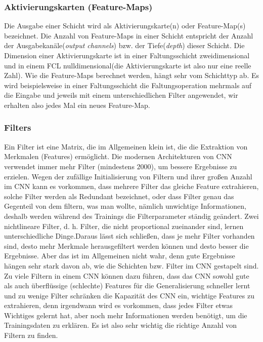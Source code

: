 \documentclass[12pt,a4paper]{scrartcl}
\numberwithin{equation}{section}
\begin{document}
\subsubsection{Aktivierungskarten (Feature-Maps)}
Die Ausgabe einer Schicht wird als Aktivierungskarte(n) oder Feature-Map(s) bezeichnet. Die Anzahl von Feature-Maps in einer Schicht entspricht der Anzahl der Ausgabekanäle(\textit{output channels}) bzw. der Tiefe(\textit{depth}) dieser Schicht. Die Dimension einer Aktivierungskarte ist in einer Faltungsschicht zweidimensional und in einem \ac{FCL} nulldimensional(die Aktivierungskarte ist also nur eine reelle Zahl). Wie die Feature-Maps berechnet werden, hängt sehr vom Schichttyp ab. Es wird beispielsweise in einer Faltungsschicht die Faltungsoperation mehrmals auf die Eingabe und jeweils mit einem unterschiedlichen Filter angewendet, wir erhalten also jedes Mal ein neues Feature-Map.

\subsubsection{Filters}\label{Filter}
Ein Filter ist eine Matrix, die im Allgemeinen  klein ist, die die Extraktion von Merkmalen (Features) ermöglicht. Die modernen Architekturen von \ac{CNN} verwendet immer mehr Filter (mindestens $ 2000 $), um bessere Ergebnisse zu erzielen. Wegen der zufällige Initialisierung von Filtern und ihrer großen Anzahl im \ac{CNN} kann es vorkommen, dass mehrere Filter das gleiche Feature extrahieren, solche Filter werden als Redundant bezeichnet, oder dass Filter genau das Gegenteil von dem filtern, was man wollte, nämlich unwichtige Informationen, deshalb werden während des Trainings die Filterparameter ständig geändert. Zwei nichtlineare Filter, d. h. Filter, die nicht proportional zueinander sind, lernen unterschiedliche Dinge.Daraus lässt sich schließen, dass je mehr Filter vorhanden sind, desto mehr Merkmale herausgefiltert werden können und desto besser die Ergebnisse. Aber das ist im Allgemeinen nicht wahr, denn gute Ergebnisse hängen sehr stark davon ab, wie die Schichten bzw. Filter im CNN gestapelt sind. Zu viele Filtern in einem \ac{CNN} können dazu führen, dass das \ac{CNN} sowohl gute  als auch überflüssige (schlechte) Features für die Generalisierung schneller lernt und zu wenige Filter schränken die Kapazität des \ac{CNN} ein,  wichtige Features zu extrahieren, denn irgendwann wird es vorkommen, dass jedes Filter etwas Wichtiges gelernt hat, aber noch mehr Informationen werden benötigt, um die Trainingsdaten zu erklären. Es ist also sehr wichtig die richtige Anzahl von Filtern zu finden.
\end{document}
